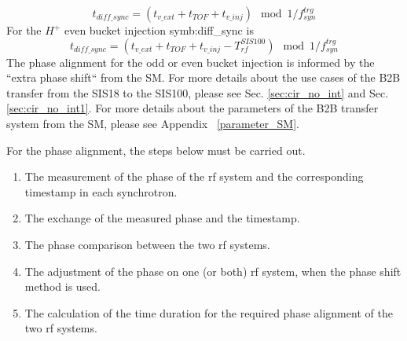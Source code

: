 \begin{equation}
	t_{\mathit{diff\_sync}}=(t_{\mathit{v\_ext}}+t_{\mathit{TOF}}+t_{\mathit{v\_inj}}) \mod 1/f_\mathit{syn}^\mathit{trg}
\end{equation}
For the $H^{+}$ even bucket injection \gls{symb:diff_sync} is
\begin{equation}
t_{\mathit{diff\_sync}}=(t_{\mathit{v\_ext}}+t_{\mathit{TOF}}+t_{\mathit{v\_inj}}- T_{\mathit{rf}}^{\mathit{SIS100}}) \mod 1/f_\mathit{syn}^\mathit{trg} 
\end{equation}
The phase alignment for the odd or even bucket injection is informed by the ``extra phase shift`` from the SM. For more details about the use cases of the B2B transfer from the SIS18 to the SIS100, please see Sec. \ref{sec:cir_no_int} and Sec. \ref{sec:cir_no_int1}. For more details about the parameters of the B2B transfer system from the SM, please see Appendix ~\ref{parameter_SM}.  

For the phase alignment, the steps below must be carried out. 
\begin{enumerate}
\item The measurement of the phase of the rf system and the corresponding timestamp in each synchrotron.
\item The exchange of the measured phase and the timestamp.
\item The phase comparison between the two rf systems.
\item The adjustment of the phase on one (or both) rf system, when the phase shift method is used. 
\item The calculation of the time duration for the required phase alignment of the two rf systems.
\end{enumerate}

